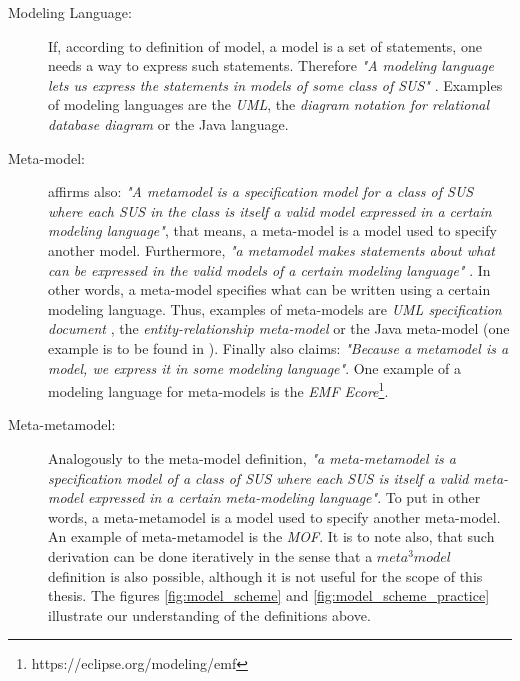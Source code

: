 \documentclass[tuberlin,cic,tc,english,noabntcite]{iiufrgs}
\begin{document}
\begin{description}
	\item[Modeling Language:] If, according to definition of model, a model is a set of statements, one needs a way to express such statements. Therefore \emph{"A modeling language lets us express the statements in models of some class of SUS"} \citep[p. 28]{seidewitz2003models}. Examples of modeling languages are the \emph{UML}, the \emph{diagram notation for relational database diagram} or the Java language.

	\item[Meta-model:] \citet[p. 28]{seidewitz2003models} affirms also: \emph{"A metamodel is a specification model for a class of SUS where each SUS in the class is itself a valid model expressed in a certain modeling language"}, that means, a meta-model is a model used to specify another model. Furthermore, \emph{"a metamodel makes statements about what can be expressed in the valid models of a certain modeling language"} \citep[p. 28]{seidewitz2003models}. In other words, a meta-model specifies what can be written using a certain modeling language. Thus, examples of meta-models are \emph{UML specification document} \citep{omg2007unified}, the \emph{entity-relationship meta-model} \citep{chen1976entity} or the Java meta-model (one example is to be found in \citet{heidenreich2009jamopp}). Finally \citet[p. 29]{seidewitz2003models} also claims: \emph{"Because a metamodel is a model, we express it in some modeling language"}. One example of a modeling language for meta-models is the \emph{EMF Ecore}\footnote{https://eclipse.org/modeling/emf}.

	\item[Meta-metamodel:] Analogously to the meta-model definition, \emph{"a meta-metamodel is a specification model of a class of SUS where each SUS is itself a valid meta-model expressed in a certain meta-modeling language"}. To put in other words, a meta-metamodel is a model used to specify another meta-model. An example of meta-metamodel is the \emph{MOF}\citep{omg2015meta}. It is to note also, that such derivation can be done iteratively in the sense that a $meta^3model$ definition is also possible, although it is not useful for the scope of this thesis. The figures \ref{fig:model_scheme} and \ref{fig:model_scheme_practice} illustrate our understanding of the definitions above.


\end{description}
\end{document}
